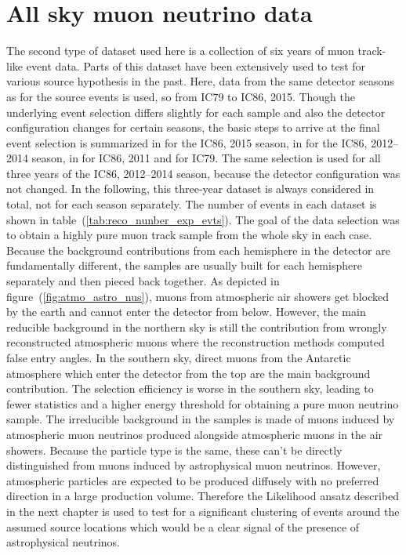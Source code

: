 \section{All sky muon neutrino data}
The second type of dataset used here is a collection of six years of muon track-like event data.
Parts of this dataset have been extensively used to test for various source hypothesis in the past.
Here, data from the same detector seasons as for the source events is used, so from IC79 to IC86, 2015.
Though the underlying event selection differs slightly for each sample and also the detector configuration changes for certain seasons, the basic steps to arrive at the final event selection is summarized in \cite{Aartsen:2016qbu} for the IC86, 2015 season, in \cite{Aartsen:2016oji} for the IC86, 2012--2014 season, in \cite{Aartsen:2013uuv} for IC86, 2011 and \cite{Aartsen:2014PS4yrs} for IC79.
The same selection is used for all three years of the IC86, 2012--2014 season, because the detector configuration was not changed.
In the following, this three-year dataset is always considered in total, not for each season separately.
The number of events in each dataset is shown in table~(\ref{tab:reco_nunber_exp_evts}).
The goal of the data selection was to obtain a highly pure muon track sample from the whole sky in each case.
Because the background contributions from each hemisphere in the detector are fundamentally different, the samples are usually built for each hemisphere separately and then pieced back together.
As depicted in figure~(\ref{fig:atmo_astro_nus}), muons from atmospheric air showers get blocked by the earth and cannot enter the detector from below.
However, the main reducible background in the northern sky is still the contribution from wrongly reconstructed atmospheric muons where the reconstruction methods computed false entry angles.
In the southern sky, direct muons from the Antarctic atmosphere which enter the detector from the top are the main background contribution.
The selection efficiency is worse in the southern sky, leading to fewer statistics and a higher energy threshold for obtaining a pure muon neutrino sample.
The irreducible background in the samples is made of muons induced by atmospheric muon neutrinos produced alongside atmospheric muons in the air showers.
Because the particle type is the same, these can't be directly distinguished from muons induced by astrophysical muon neutrinos.
However, atmospheric particles are expected to be produced diffusely with no preferred direction in a large production volume.
Therefore the Likelihood ansatz described in the next chapter is used to test for a significant clustering of events around the assumed source locations which would be a clear signal of the presence of astrophysical neutrinos.

